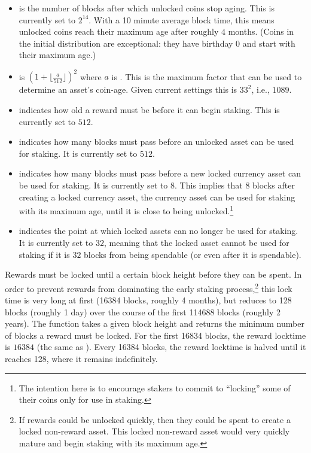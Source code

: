 \begin{itemize}
\item {} is the number of blocks after which unlocked coins
stop aging. This is currently set to $2^{14}$. With a 10 minute average block time,
this means unlocked coins reach their maximum age after roughly $4$ months.
(Coins in the initial distribution are exceptional: they have birthday $0$ and start with their maximum age.)
\item {} is $(1+\lfloor \frac{a}{512}\rfloor)^2$ where $a$ is {}.
This is the maximum factor that can be used to determine an asset's coin-age.
Given current settings this is $33^2$, i.e., $1089$.
\item {} indicates how old a reward must be before it can begin staking. This is currently set to $512$.
\item {} indicates how many blocks must pass before
an unlocked asset can be used for staking. It is currently set to $512$.
\item {} indicates how many blocks must pass before
a new locked currency asset can be used for staking.
It is currently set to $8$. This implies that $8$ blocks after creating a locked
currency asset, the currency asset can be used for staking with its maximum age,
until it is close to being unlocked.\footnote{The intention here is to encourage
stakers to commit to ``locking'' some of their coins only for use in staking.}
\item {} indicates the point at which locked assets can
no longer be used for staking. It is currently set to $32$, meaning that
the locked asset cannot be used for staking if it is $32$ blocks from being spendable
(or even after it is spendable).
\end{itemize}

Rewards must be locked until a certain block height before they can be spent.
In order to prevent rewards from dominating the early staking process,\footnote{If rewards could be unlocked quickly, then they could be
spent to create a locked non-reward asset. This locked non-reward asset would
very quickly mature and begin staking with its maximum age.}
this lock time is very long at first (16384 blocks, roughly 4 months), but reduces to
128 blocks (roughly 1 day) over the course of the first 114688 blocks (roughly 2 years).
The function {} takes a given block height and
returns the minimum number of blocks a reward must be locked.
For the first 16834 blocks, the reward locktime is $16384$ (the same as {}).
Every 16384 blocks, the reward locktime is halved
until it reaches 128, where it remains indefinitely.

